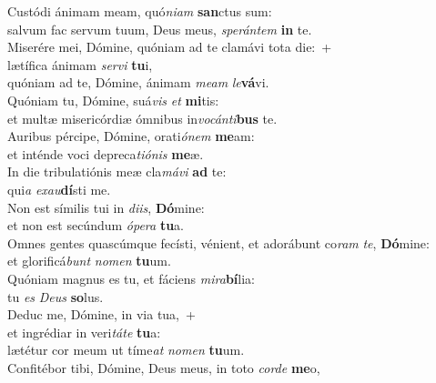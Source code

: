 \evenverse Custódi ánimam meam, quó\textit{ni}\textit{am} \textbf{san}ctus sum:~\*\\
\evenverse salvum fac servum tuum, Deus meus, \textit{spe}\textit{rán}\textit{tem} \textbf{in} te.\\
\oddverse Miserére mei, Dómine, quóniam ad te clamávi tota die:~+\\
\oddverse  lætífica ánimam \textit{ser}\textit{vi} \textbf{tu}i,~\*\\
\oddverse quóniam ad te, Dómine, ánimam \textit{me}\textit{am} \textit{le}\textbf{vá}vi.\\
\evenverse Quóniam tu, Dómine, suá\textit{vis} \textit{et} \textbf{mi}tis:~\*\\
\evenverse et multæ misericórdiæ ómnibus in\textit{vo}\textit{cán}\textit{ti}\textbf{bus} te.\\
\oddverse Auribus pércipe, Dómine, orati\textit{ó}\textit{nem} \textbf{me}am:~\*\\
\oddverse et inténde voci depreca\textit{ti}\textit{ó}\textit{nis} \textbf{me}æ.\\
\evenverse In die tribulatiónis meæ cla\textit{má}\textit{vi} \textbf{ad} te:~\*\\
\evenverse qui\textit{a} \textit{e}\textit{xau}\textbf{dí}sti me.\\
\oddverse Non est símilis tui in \textit{di}\textit{is}, \textbf{Dó}mine:~\*\\
\oddverse et non est secúndum \textit{ó}\textit{pe}\textit{ra} \textbf{tu}a.\\
\evenverse Omnes gentes quascúmque fecísti, vénient, et adorábunt co\textit{ram} \textit{te}, \textbf{Dó}mine:~\*\\
\evenverse et glorificá\textit{bunt} \textit{no}\textit{men} \textbf{tu}um.\\
\oddverse Quóniam magnus es tu, et fáciens \textit{mi}\textit{ra}\textbf{bí}lia:~\*\\
\oddverse tu \textit{es} \textit{De}\textit{us} \textbf{so}lus.\\
\evenverse Deduc me, Dómine, in via tua,~+\\
\evenverse  et ingrédiar in veri\textit{tá}\textit{te} \textbf{tu}a:~\*\\
\evenverse lætétur cor meum ut tíme\textit{at} \textit{no}\textit{men} \textbf{tu}um.\\
\oddverse Confitébor tibi, Dómine, Deus meus, in toto \textit{cor}\textit{de} \textbf{me}o,~\*\\
